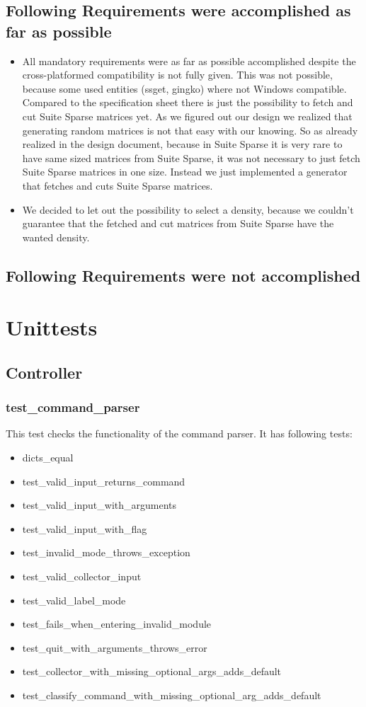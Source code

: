 \documentclass[parskip=full]{scrartcl}
\begin{document}
\subsection{Following Requirements were accomplished as far as possible}
\begin{itemize}
\item All mandatory requirements were as far as possible accomplished despite the cross-platformed compatibility is not fully given. 
This was not possible, because some used entities (ssget, gingko) where not Windows compatible.
Compared to the specification sheet there is just the possibility to fetch and cut Suite Sparse matrices yet.
As we figured out our design we realized that generating random matrices is not that easy with our knowing.
So as already realized in the design document, because in Suite Sparse it is very rare to have same sized matrices from Suite Sparse, it was not necessary to just fetch Suite Sparse matrices in one size. 
Instead we just implemented a generator that fetches and cuts Suite Sparse matrices.
\item We decided to let out the possibility to select a density, because we couldn't guarantee that the fetched and cut matrices from Suite Sparse have the wanted density.
\end{itemize}


\subsection{Following Requirements were not accomplished}


\section{Unittests}
\subsection{Controller}
\subsubsection{test_command_parser}
This test checks the functionality of the command parser.
It has following tests:
\begin{itemize}
\item dicts_equal
\item test_valid_input_returns_command
\item test_valid_input_with_arguments
\item test_valid_input_with_flag
\item test_invalid_mode_throws_exception
\item test_valid_collector_input
\item test_valid_label_mode
\item test_fails_when_entering_invalid_module
\item test_quit_with_arguments_throws_error
\item test_collector_with_missing_optional_args_adds_default
\item test_classify_command_with_missing_optional_arg_adds_default
\end{itemize}
\end{document}
